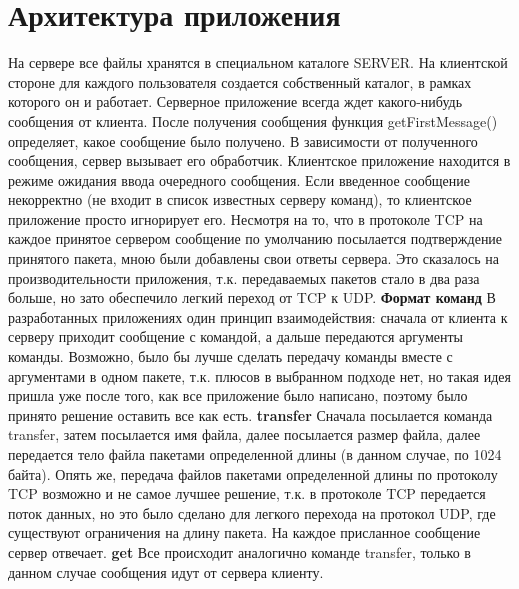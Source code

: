 \documentclass[12pt,a4paper]{report}
\begin{document}
\section{Архитектура приложения}
На сервере все файлы хранятся в специальном каталоге SERVER. На клиентской стороне для каждого пользователя создается собственный каталог, в рамках которого он и работает.
\newline
Серверное приложение всегда ждет какого-нибудь сообщения от клиента. После получения сообщения функция getFirstMessage() определяет, какое сообщение было получено. В зависимости от полученного сообщения, сервер вызывает его обработчик.\newline 
Клиентское приложение находится в режиме ожидания ввода очередного сообщения. Если введенное сообщение некорректно (не входит в список известных серверу команд), то клиентское приложение просто игнорирует его.\newline
Несмотря на то, что в протоколе TCP на каждое принятое сервером сообщение по умолчанию посылается подтверждение принятого пакета, мною были добавлены свои ответы сервера. Это сказалось на производительности приложения, т.к. передаваемых пакетов стало в два раза больше, но зато обеспечило легкий переход от TCP к UDP.\newline\newline
\textbf{Формат команд}\newline
В разработанных приложениях один принцип взаимодействия:
сначала от клиента к серверу приходит сообщение с командой, а дальше передаются аргументы команды. Возможно, было бы лучше сделать передачу команды вместе с аргументами в одном пакете, т.к. плюсов в выбранном подходе нет, но такая идея пришла уже после того, как все приложение было написано, поэтому было принято решение оставить все как есть.\newline 
\textbf{transfer}\newline
Сначала посылается команда transfer, затем посылается имя файла, далее посылается размер файла, далее передается тело файла пакетами определенной длины (в данном случае, по 1024 байта). Опять же, передача файлов пакетами определенной длины по протоколу TCP возможно и не самое лучшее решение, т.к. в протоколе TCP передается поток данных, но это было сделано для легкого перехода на протокол UDP, где существуют ограничения на длину пакета. На каждое присланное сообщение сервер отвечает.\newline
\textbf{get}\newline
Все происходит аналогично команде transfer, только в данном случае сообщения идут от сервера клиенту.
\end{document}
